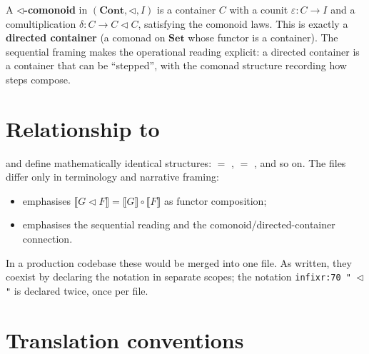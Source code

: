\documentclass[11pt,a4paper]{article}
\begin{document}
A \textbf{$\triangleleft$-comonoid} in $(\mathbf{Cont}, \triangleleft, I)$ is
a container $C$ with a counit $\varepsilon : C \to I$ and a comultiplication
$\delta : C \to C \triangleleft C$, satisfying the comonoid laws.  This is
exactly a \textbf{directed container} (a comonad on $\mathbf{Set}$ whose
functor is a container).  The sequential framing makes the operational
reading explicit: a directed container is a container that can be
``stepped'', with the comonad structure recording how steps compose.

\section{Relationship to }

\begin{fidelitynote}
 and  define mathematically
identical structures:  $=$ ,
 $=$ , and so on.  The files differ only in
terminology and narrative framing:
\begin{itemize}
  \item {} emphasises $\llbracket G \triangleleft F
    \rrbracket = \llbracket G \rrbracket \circ \llbracket F \rrbracket$ as
    functor composition;
  \item {} emphasises the sequential reading and the
    comonoid/directed-container connection.
\end{itemize}
In a production codebase these would be merged into one file.  As written,
they coexist by declaring the notation in separate scopes; the notation
\texttt{infixr:70 " $\triangleleft$ "} is declared twice, once per file.
\end{fidelitynote}

\section{Translation conventions}
\end{document}
